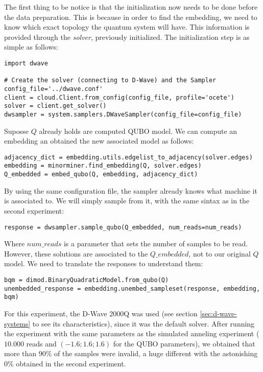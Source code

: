 The first thing to be notice is that the initialization now needs to be done before the data preparation. This is because in order to find the embedding, we need to know which exact topology the quantum system will have. This information is provided through the \emph{solver}, previously initialized. The initialization step is as simple as follows:

\begin{verbatim}
import dwave

# Create the solver (connecting to D-Wave) and the Sampler
config_file='../dwave.conf'
client = cloud.Client.from_config(config_file, profile='ocete')
solver = client.get_solver()
dwsampler = system.samplers.DWaveSampler(config_file=config_file)
\end{verbatim}

Suposse $Q$ already holds are computed QUBO model. We can compute an embedding an obtained the new associated model as follows:

\begin{verbatim}
adjacency_dict = embedding.utils.edgelist_to_adjacency(solver.edges)
embedding = minorminer.find_embedding(Q, solver.edges)
Q_embedded = embed_qubo(Q, embedding, adjacency_dict)
\end{verbatim}

By using the same configuration file, the sampler already knows what machine it is associated to. We will simply sample from it, with the same sintax as in the second experiment:

\begin{verbatim}
response = dwsampler.sample_qubo(Q_embedded, num_reads=num_reads)
\end{verbatim}

Where $num\_reads$ is a parameter that sets the number of samples to be read. However, these solutions are associated to the $Q\_embedded$, not to our original $Q$ model. We need to translate the responses to understand them:

\begin{verbatim}
bqm = dimod.BinaryQuadraticModel.from_qubo(Q)
unembedded_response = embedding.unembed_sampleset(response, embedding, bqm)
\end{verbatim}

For this experiment, the D-Wave 2000Q was used (see section \ref{sec:d-wave-systems} to see its characteristics), since it was the default solver. After running the experiment with the same parameters as the simulated anneling experiment ($10.000$ reads and $(-1.6; 1.6; 1.6)$ for the QUBO parameters), we obtained that more than $90\%$ of the samples were invalid, a huge different with the astonishing $0\%$ obtained in the second experiment.

